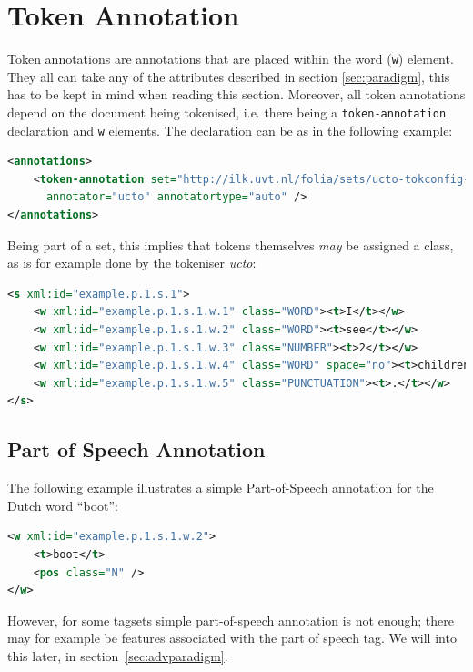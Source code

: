 \documentclass[a4paper,12pt]{report}
\begin{document}
\section{Token Annotation}

Token annotations are annotations that are placed within the word (\texttt{w}) element. They all can take any of the attributes described in section \ref{sec:paradigm}, this has to be kept in mind when reading this section. Moreover, all token annotations depend on the document being tokenised, i.e. there being a \texttt{token-annotation} declaration and \texttt{w} elements. The declaration can be as in the following example:

\begin{lstlisting}[language=xml]
<annotations>
    <token-annotation set="http://ilk.uvt.nl/folia/sets/ucto-tokconfig-nl"
      annotator="ucto" annotatortype="auto" />
</annotations>
\end{lstlisting}

Being part of a set, this implies that tokens themselves \emph{may} be assigned a class, as is for example done by the tokeniser \emph{ucto}:

\begin{lstlisting}[language=xml]
<s xml:id="example.p.1.s.1">
    <w xml:id="example.p.1.s.1.w.1" class="WORD"><t>I</t></w>
    <w xml:id="example.p.1.s.1.w.2" class="WORD"><t>see</t></w>
    <w xml:id="example.p.1.s.1.w.3" class="NUMBER"><t>2</t></w>
    <w xml:id="example.p.1.s.1.w.4" class="WORD" space="no"><t>children</t></w>
    <w xml:id="example.p.1.s.1.w.5" class="PUNCTUATION"><t>.</t></w>
</s>
\end{lstlisting}        


\subsection{Part of Speech Annotation}

The following example illustrates a simple Part-of-Speech annotation for the Dutch word ``boot'':

\begin{lstlisting}[language=xml]
<w xml:id="example.p.1.s.1.w.2">
    <t>boot</t>
    <pos class="N" />
</w>
\end{lstlisting}



However, for some tagsets simple part-of-speech annotation is not enough; there may for example be features associated with the part of speech tag. We will into this later, in section~\ref{sec:advparadigm}.
\end{document}
